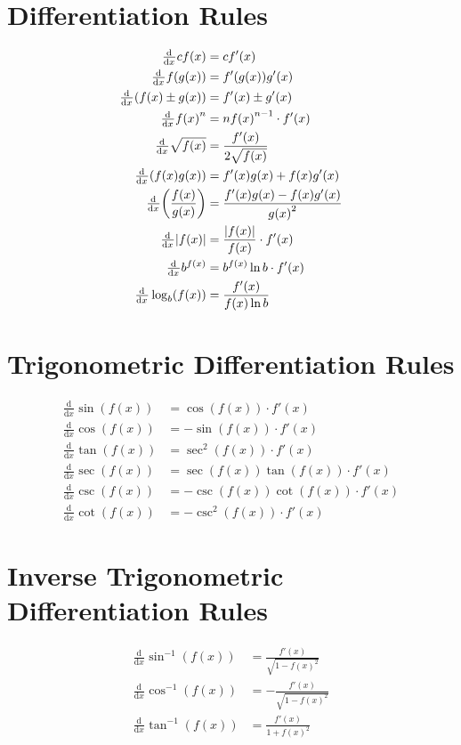 \documentclass[12pt]{article}
\DeclarePairedDelimiter\abs{\lvert}{\rvert}
\DeclarePairedDelimiter\paren{(}{)}
\newcommand*{\asin}{\sin^{-1}}
\newcommand*{\acos}{\cos^{-1}}
\newcommand*{\atan}{\tan^{-1}}
\newcommand*{\dd}[3][]{\tfrac{\mathrm{d}^{#1}#2}{\mathrm{d}#3^{#1}}}
\newcommand*{\fixmath}{%
  \makebox{}\vspace{\glueexpr-\baselineskip-\abovedisplayskip}}
\newenvironment{fixskip}{\setlength{\abovedisplayskip}{0pt}%
  \setlength{\belowdisplayskip}{0pt}\fixmath\ignorespaces}%
  {\ignorespacesafterend}
\begin{document}
\section*{Differentiation Rules}
\begin{fixskip}
  \begin{align*}
    \dd{}{x}c f(x) &= c f'(x)\\
    \dd{}{x}f(g(x)) &= f'(g(x))g'(x)\\
    \dd{}{x}(f(x) \pm g(x)) &= f'(x) \pm g'(x)\\
    \dd{}{x}{f(x)}^n &= n{f(x)}^{n-1} \cdot f'(x)\\
    \dd{}{x}\sqrt{f(x)} &= \frac{f'(x)}{2\sqrt{f(x)}}\\
    \dd{}{x}(f(x)g(x)) &= f'(x)g(x) + f(x)g'(x)\\
    \dd{}{x}\paren*{\frac{f(x)}{g(x)}} &= \frac{f'(x)g(x) - f(x)g'(x)}
      {{g(x)}^2}\\
    \dd{}{x}\abs*{f(x)} &= \frac{\abs*{f(x)}}{f(x)} \cdot f'(x)\\
    \dd{}{x}b^{f(x)} &= b^{f(x)} \ln b \cdot f'(x)\\
    \dd{}{x}\log_b(f(x)) &= \frac{f'(x)}{f(x) \ln b}
  \end{align*}
\end{fixskip}
\section*{Trigonometric Differentiation Rules}
\begin{fixskip}
  \begin{align*}
    \dd{}{x}\sin(f(x)) &= \cos(f(x)) \cdot f'(x)\\
    \dd{}{x}\cos(f(x)) &= -\sin(f(x)) \cdot f'(x)\\
    \dd{}{x}\tan(f(x)) &= \sec^2(f(x)) \cdot f'(x)\\
    \dd{}{x}\sec(f(x)) &= \sec(f(x))\tan(f(x)) \cdot f'(x)\\
    \dd{}{x}\csc(f(x)) &= -\csc(f(x))\cot(f(x)) \cdot f'(x)\\
    \dd{}{x}\cot(f(x)) &= -\csc^2(f(x)) \cdot f'(x)
  \end{align*}
\end{fixskip}
\section*{Inverse Trigonometric Differentiation Rules}
\begin{fixskip}
  \begin{align*}
    \dd{}{x}\asin(f(x)) &= \frac{f'(x)}{\sqrt{1 - {f(x)}^2}}\\
    \dd{}{x}\acos(f(x)) &= -\frac{f'(x)}{\sqrt{1 - {f(x)}^2}}\\
    \dd{}{x}\atan(f(x)) &= \frac{f'(x)}{1 + {f(x)}^2}
  \end{align*}
\end{fixskip}
\end{document}
